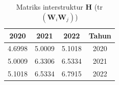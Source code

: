 \begin{table}[H]
\centering
\caption{Matriks interstruktur $\mathbf{H}$ (tr$(\mathbf{W}_i\mathbf{W}_j)$)} \label{tab:H_inter}
\begin{tabular}{|c|c|c|c|}
\hline
\textbf{2020} & \textbf{2021} & \textbf{2022} & \textbf{Tahun} \\
\hline
4.6998 & 5.0009 & 5.1018 & 2020 \\
5.0009 & 6.3306 & 6.5334 & 2021 \\
5.1018 & 6.5334 & 6.7915 & 2022 \\
\hline
\end{tabular}
\end{table}